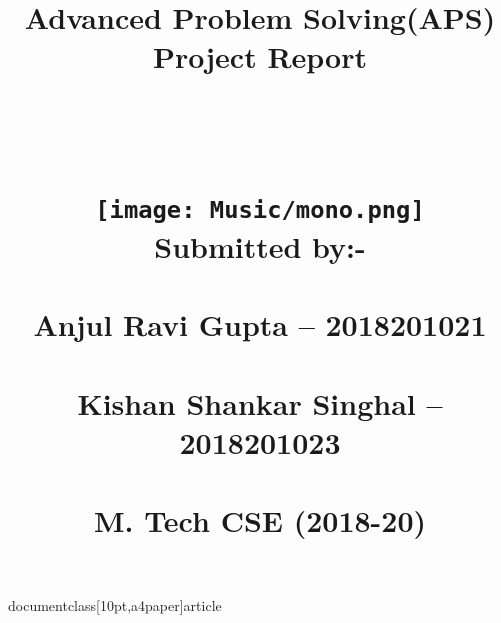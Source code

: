 documentclass[10pt,a4paper]{article}
\usepackage[utf8]{inputenc}
\usepackage{amsmath}
\usepackage{amsfonts}
\usepackage{hyperref}
\usepackage{graphicx}
\usepackage{amssymb}
\title{
		\normalfont \normalsize \textsc{} \\ [25pt]
		\horrule \\[0.4cm]
		\huge Advanced Problem Solving(APS) \\Project Report \\ \\
	\\ \\
	    	\texttt{[image: Music/mono.png]} 
		\\ Submitted by:- \\ \\
		Anjul Ravi Gupta – 2018201021\\
	\\Kishan Shankar Singhal – 2018201023 \\ \\
	M. Tech CSE (2018-20)
		\horrule \\[0.5cm]
		\date{\vspace{-5ex}}
}

\maketitle

   
